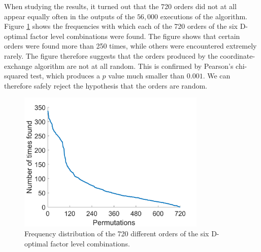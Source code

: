 When studying the results, it turned out that the 720 orders did not at all appear equally often in the outputs of the $56,000$ executions of the algorithm. Figure \ref{figPermutations} shows the frequencies with which each of the 720 orders of the six D-optimal factor level combinations were found. The figure shows that certain orders were found more than 250 times, while others were encountered extremely rarely. The figure therefore suggests that the orders produced by the coordinate-exchange algorithm are not at all random. This is confirmed by Pearson's chi-squared test, which produces a $p$ value much smaller than $0.001$. We can therefore safely reject the hypothesis that the orders are random.\\

\begin{figure}%
	\centering
	\includegraphics[width=0.8\textwidth]{permutations.png}
	\caption{Frequency distribution of the 720 different orders of the six D-optimal factor level combinations.}
	\label{figPermutations}
\end{figure}


